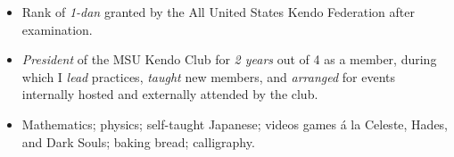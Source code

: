 \headerskip
\begin{itemize}[nosep]
  \item Rank of \emph{1-dan}
      granted by the All United States Kendo Federation after examination.
  \item \emph{President} of the MSU Kendo Club
      for \emph{2 years} out of 4 as a member,
      during which I
          \emph{lead} practices,
          \emph{taught} new members,
          and \emph{arranged} for events internally hosted
      and externally attended by the club.
\end{itemize}

\bodyskip

\headerskip
\begin{itemize}[nosep]
    \item
        Mathematics;
        physics;
        self-taught Japanese;
        videos games \'a la Celeste, Hades, and Dark Souls;
        baking bread;
        calligraphy.
\end{itemize}
